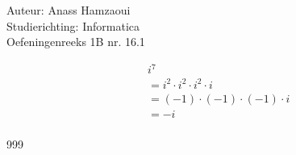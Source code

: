 \documentclass[a4paper]{article}
\begin{document}
  
\noindent \large Auteur: Anass Hamzaoui \\
\noindent \large Studierichting: Informatica \\
\noindent \large Oefeningenreeks 1B nr. 16.1 \\

\medskip

\normalsize

\begin{eqnarray*}
    && i^7 \\
    && = i^2 \cdot i^2 \cdot i^2 \cdot i \\
    && = (-1) \cdot (-1) \cdot (-1) \cdot i \\
    && = -i \\
\end{eqnarray*}

\begin{thebibliography}{999}
\end{thebibliography}
\end{document}
